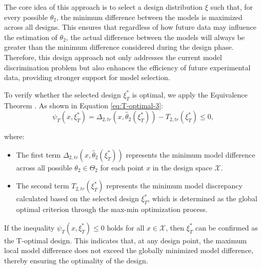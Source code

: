 \hspace*{8mm} The core idea of this approach is to select a design distribution $\xi$ such that, for every possible $\theta_2$, the minimum difference between the models is maximized across all designs. This ensures that regardless of how future data may influence the estimation of $\theta_2$, the actual difference between the models will always be greater than the minimum difference considered during the design phase. Therefore, this design approach not only addresses the current model discrimination problem but also enhances the efficiency of future experimental data, providing stronger support for model selection.

\begin{theorem}
To verify whether the selected design $\xi_T^\ast$ is optimal, we apply the Equivalence Theorem \citep{atkinson1975design,atkinson1975optimal} . As shown in Equation \eqref{eq:T-optimal-3}:
\begin{equation}\label{eq:T-optimal-3}
\psi_T(x, \xi_T^\ast) = \Delta_{2,tr}(x, \hat{\theta}_2(\xi_T^\ast)) - T_{2,tr}(\xi_T^\ast) \leq 0,
\end{equation}

where:
\begin{itemize}
\item The first term $\Delta_{2,tr}(x, \hat{\theta}_2(\xi_T^\ast))$ represents the minimum model difference across all possible $\theta_2 \in \Theta_2$ for each point $x$ in the design space $\mathcal{X}$.

\item The second term $T_{2,tr}(\xi_T^\ast)$ represents the minimum model discrepancy calculated based on the selected design $\xi_T^\ast$, which is determined as the global optimal criterion through the max-min optimization process.

\end{itemize}
\end{theorem}

\hspace*{8mm} If the inequality $\psi_T(x, \xi_T^\ast) \leq 0$ holds for all $x \in \mathcal{X}$, then $\xi_T^\ast$ can be confirmed as the T-optimal design. This indicates that, at any design point, the maximum local model difference does not exceed the globally minimized model difference, thereby ensuring the optimality of the design.

